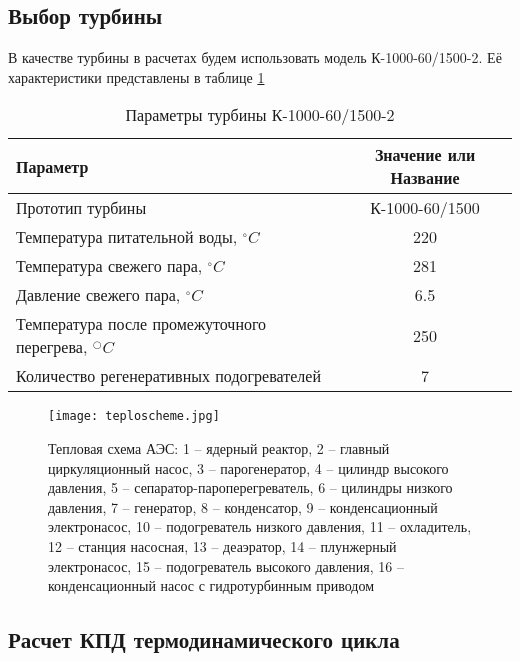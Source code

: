 \subsection{Выбор турбины}
В качестве турбины в расчетах будем использовать модель К-1000-60/1500-2. Её характеристики представлены в таблице \ref{tabular:turbine}


\begin{table}[H]
	\caption{Параметры турбины К-1000-60/1500-2 }
	\begin{center}
        \begin{tabular}{|l|c|}
        \toprule
         Параметр & Значение или Название \\ 
         \midrule
         \hline
         Прототип турбины &  К-1000-60/1500\\ 
         \hline
         Температура питательной воды, $^\circ C$ & 220 \\ 
         \hline
         Температура свежего пара, $^\circ C$  & 281\\ 
         \hline
         Давление свежего пара, $^\circ C$ & 6.5 \\ 
         \hline
         Температура после промежуточного перегрева, $^○C$ & 250 \\ 
         \hline
         Количество регенеративных подогревателей & 7 \\ 
         \bottomrule
		\end{tabular}
		\label{tabular:turbine}
	\end{center}
\end{table}


\begin{figure}[H]
	\begin{center}
		\texttt{[image: teploscheme.jpg]}
		\caption{Тепловая схема АЭС: 1 – ядерный реактор, 2 – главный
циркуляционный насос, 3 – парогенератор, 4 – цилиндр высокого давления, 5 –
сепаратор-пароперегреватель, 6 – цилиндры низкого давления, 7 – генератор, 8
– конденсатор, 9 – конденсационный электронасос, 10 – подогреватель низкого
давления, 11 – охладитель, 12 – станция насосная, 13 – деаэратор, 14 –
плунжерный электронасос, 15 – подогреватель высокого давления, 16 –
конденсационный насос с гидротурбинным приводом}
		\label{pic:teplocheme} %
	\end{center}
\end{figure}


\subsection{Расчет КПД термодинамического цикла}


